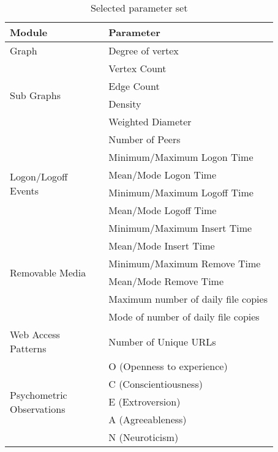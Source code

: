 \documentclass[conference,draftclsnofoot,onecolumn]{IEEEtran}%
\begin{document}
\renewcommand{\arraystretch}{1.2} 
\begin{table}[!t]
\caption{Selected parameter set}
\begin{center}
\begin{tabular}{|p{0.32\linewidth}|p{0.55\linewidth}|}
\hline \textbf{Module} & \textbf{Parameter}\\
\hline Graph & Degree of vertex\\
\hline \multirow{4}{*}{Sub Graphs} & Vertex Count\\
\cline{2-2}  & Edge Count\\
\cline{2-2}  & Density\\
\cline{2-2}  & Weighted Diameter\\
\cline{2-2}  & Number of Peers\\
\hline 
\multirow{4}{0.32\linewidth}{Logon/Logoff Events} & Minimum/Maximum Logon Time\\
\cline{2-2}  & Mean/Mode Logon Time\\
\cline{2-2}  & Minimum/Maximum Logoff Time\\
\cline{2-2}  & Mean/Mode Logoff Time\\
\hline \multirow{6}{*}{Removable Media} & Minimum/Maximum Insert Time\\
\cline{2-2}  & Mean/Mode Insert Time\\
\cline{2-2}  & Minimum/Maximum Remove Time\\
\cline{2-2}  & Mean/Mode Remove Time\\
\cline{2-2}  & Maximum number of daily file copies\\
\cline{2-2}  & Mode of number of daily file copies\\
\hline Web Access Patterns & Number of Unique URLs \\
\hline \multirow{5}{0.32\linewidth}{Psychometric Observations} & O (Openness to experience) \\
\cline{2-2}  & C (Conscientiousness)\\
\cline{2-2}  & E (Extroversion)\\
\cline{2-2}  & A (Agreeableness)\\
\cline{2-2}  & N (Neuroticism)\\
\hline 
\end{tabular}
\label{Table 2}
\end{center}
\vspace{-20pt}
\end{table}
\end{document}
